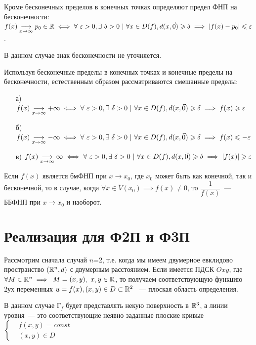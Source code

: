 \documentclass[../../main.tex]{subfiles}
\begin{document}
Кроме бесконечных пределов в конечных точках определяют предел ФНП
на бесконечности: $f(x)\underset{x \to \infty}{\longrightarrow}
p_0 \in \mathbb{R} \iff
\forall\ \varepsilon > 0, \exists\ \delta > 0\ |\
\forall x \in D(f), d(x, \vec{0}) \geqslant \delta
\implies |f(x) - p_0| \leqslant \varepsilon$.

В данном случае знак бесконечности не уточняется.

Используя бесконечные пределы в конечных точках и 
конечные пределы на бесконечности,
естественным образом рассматриваются смешанные пределы:

\begin{itemize}
	\item[а)] $f(x)\underset{x \to \infty}{\longrightarrow} +\infty \iff
	\forall\ \varepsilon > 0, \exists\ \delta > 0\ |\
	\forall x \in D(f), d(x, \vec{0}) \geqslant \delta
	\implies f(x) \geqslant \varepsilon$
	\item[б)] $f(x)\underset{x \to \infty}{\longrightarrow} -\infty \iff
	\forall\ \varepsilon > 0, \exists\ \delta > 0\ |\
	\forall x \in D(f), d(x, \vec{0}) \geqslant \delta
	\implies f(x) \leqslant -\varepsilon$
	\item[в)] $f(x)\underset{x \to \infty}{\longrightarrow} \infty \iff
	\forall\ \varepsilon > 0, \exists\ \delta > 0\ |\
	\forall x \in D(f), d(x, \vec{0}) \geqslant \delta
	\implies |f(x)| \geqslant \varepsilon$
\end{itemize}
	
Если $f(x)$ является бмФНП при $x \to x_0$, где $x_0$ может быть как конечной,
так и бесконечной, то в случае, когда $\forall x \in \dot{V}{(x_0)} \implies
f(x) \ne 0$, то $\dfrac{1}{f(x)}$~--- ББФНП при $x \to x_0$ и наоборот.
	
\section{Реализация для Ф2П и Ф3П}	

Рассмотрим сначала случай $n$=2, т.е. когда мы имеем двумерное евклидово
пространство $(\mathbb{R}^n, d)$ с двумерным расстоянием. Если имеется ПДСК $Oxy$, где
$\forall M \in \mathbb{R}^n \implies$
$M = (x, y),\ x, y \in \mathbb{R}$, то получаем
соответствующую функцию 2ух переменных 
$u = f(x), (x, y) \in D \subset \mathbb{R}^2$ ~---
плоская область определения.

В данном случае $\text{Г}_f$ будет представлять некую поверхность в $\mathbb{R}^3$,
а линии уровня~--- это соответствующие неявно заданные плоские кривые
$\left\{\begin{aligned}
	&f(x, y) = const \\
	&(x, y) \in D
\end{aligned}\right.$
\end{document}

